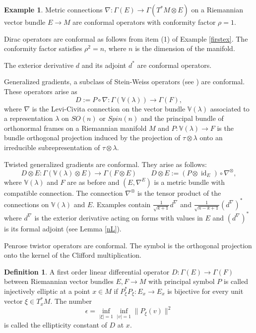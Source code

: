 \documentclass[12pt]{amsart} %
\theoremstyle{definition}
\newtheorem{definition}[theorem]{Definition}
\newtheorem{example}[theorem]{Example}
\numberwithin{equation}{section}
\DeclareMathOperator{\id}{id}
\newcommand{\bV}{{{\mathbb V}}}
\newcommand{\ra}{\rightarrow}
\begin{document}
\begin{example}

\item[(1)] Metric connections $\nabla:\Gamma(E)\ra \Gamma(T^ *M\otimes E)$ on a Riemannian vector bundle $E \ra M$ are conformal operators with conformity factor $\rho=1$.

\item[(2)] Dirac operators are conformal as follows from item (1) of Example \ref{firstex}. The conformity factor satisfies $\rho^ 2=n$, where $n$ is the dimension of the manifold.

\item[(3)] The exterior derivative $d$ and its adjoint $d^ *$ are conformal operators.

\item[(4)] Generalized gradients, a subclass of Stein-Weiss operators (see \cite{Br1,CGH2000}) are conformal. These operators arise as 
\[D:=P\circ \nabla:\Gamma(\bV(\lambda))\ra \Gamma(F),\]
where $\nabla$ is the Levi-Civita connection on the vector bundle $\bV(\lambda)$ associated to a representation $\lambda$ on $SO(n)$ or $Spin(n)$ and the principal bundle of orthonormal frames on a Riemannian manifold $M$ and $P:\bV(\lambda)\ra F$ is the bundle orthogonal projection induced by the projection  of $\tau\otimes \lambda$ onto an irreducible subrepresentation of $\tau\otimes \lambda$.

\item[(5)] Twisted generalized gradients are conformal.  They arise as follows: 
\[D\otimes E:\Gamma(\bV(\lambda)\otimes E)\ra \Gamma(F\otimes E) \qquad D\otimes E:=(P\otimes \id_E)\circ \nabla^ {\otimes},\]
where $\bV(\lambda)$ and $F$ are as before and $(E,\nabla^E)$ is a metric bundle with compatible connection. The connection $\nabla^ {\otimes}$ is the tensor product of the connections on $\bV(\lambda)$ and $E$. Examples contain $\frac{1}{\sqrt{k+1}}d^ {\nabla}$ and $\frac{1}{\sqrt{n-k+1}}(d^{\nabla})^*$ where $d^ {\nabla}$  is the exterior derivative acting on forms with values in $E$ and $(d^ {\nabla})^ *$ is its formal adjoint (see Lemma \ref{nL}).

\item[(6)] Penrose twistor operators are conformal. The symbol is the orthogonal projection onto the kernel of the Clifford multiplication.
\end{example}

\begin{definition} A first order linear differential operator $D:\Gamma(E)\ra \Gamma(F)$ between Riemannian vector bundles $E,F\ra M$ with principal symbol $P$ is called injectively elliptic at a point $x\in M$ if $P_{\xi}^ *P_{\xi}:E_x\ra E_x$ is bijective for every unit vector $\xi\in T_x^*M $. The number
\[ \epsilon = \inf_{|\xi|=1}\inf_{|v|=1} \|P_{\xi}(v)\|^2\]
is called the ellipticity constant of $D$ at $x$.
\end{definition}
\end{document}
